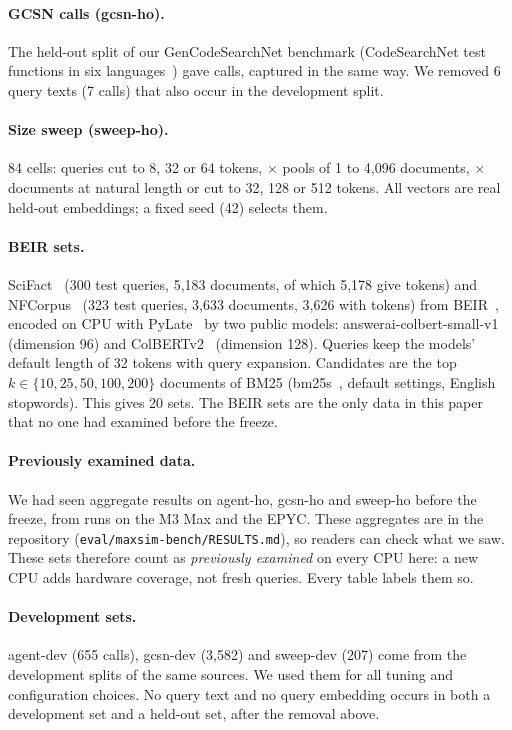 \paragraph{GCSN calls (gcsn-ho).}
The held-out split of our GenCodeSearchNet benchmark (CodeSearchNet test functions in six languages~\cite{husain2019codesearchnet}) gave  calls, captured in the same way.
We removed 6 query texts (7 calls) that also occur in the development split.

\paragraph{Size sweep (sweep-ho).}
84 cells: queries cut to 8, 32 or 64 tokens, $\times$ pools of 1 to 4,096 documents, $\times$ documents at natural length or cut to 32, 128 or 512 tokens.
All vectors are real held-out embeddings; a fixed seed (42) selects them.

\paragraph{BEIR sets.}
SciFact~\cite{wadden2020scifact} (300 test queries, 5,183 documents, of which 5,178 give tokens) and NFCorpus~\cite{boteva2016nfcorpus} (323 test queries, 3,633 documents, 3,626 with tokens) from BEIR~\cite{thakur2021beir}, encoded on CPU with PyLate~\cite{chaffin2025pylatecikm} by two public models: answerai-colbert-small-v1~\cite{clavie2024answerai} (dimension 96) and ColBERTv2~\cite{santhanam2022colbertv2} (dimension 128).
Queries keep the models' default length of 32 tokens with query expansion.
Candidates are the top $k \in \{10, 25, 50, 100, 200\}$ documents of BM25 (bm25s~\cite{lu2024bm25s}, default settings, English stopwords).
This gives 20 sets.
The BEIR sets are the only data in this paper that no one had examined before the freeze.

\paragraph{Previously examined data.}
We had seen aggregate results on agent-ho, gcsn-ho and sweep-ho before the freeze, from runs on the M3 Max and the EPYC.
These aggregates are in the repository (\nolinkurl{eval/maxsim-bench/RESULTS.md}), so readers can check what we saw.
These sets therefore count as \emph{previously examined} on every CPU here: a new CPU adds hardware coverage, not fresh queries.
Every table labels them so.

\paragraph{Development sets.}
agent-dev (655 calls), gcsn-dev (3,582) and sweep-dev (207) come from the development splits of the same sources.
We used them for all tuning and configuration choices.
No query text and no query embedding occurs in both a development set and a held-out set, after the removal above.

